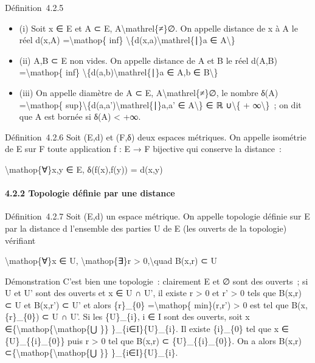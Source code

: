 \documentclass[]{article}
\begin{document}
Définition~4.2.5

\begin{itemize}
\itemsep1pt\parskip0pt
\item
  (i) Soit x ∈ E et A ⊂ E, A\textbackslash{}mathrel\{≠\}∅. On appelle
  distance de x à A le réel d(x,A) =\textbackslash{}mathop\{ inf\}
  \textbackslash{}\{d(x,a)\textbackslash{}mathrel\{∣\}a ∈
  A\textbackslash{}\}
\item
  (ii) A,B ⊂ E non vides. On appelle distance de A et B le réel d(A,B)
  =\textbackslash{}mathop\{ inf\}
  \textbackslash{}\{d(a,b)\textbackslash{}mathrel\{∣\}a ∈ A,b ∈
  B\textbackslash{}\}
\item
  (iii) On appelle diamètre de A ⊂ E, A\textbackslash{}mathrel\{≠\}∅, le
  nombre δ(A) =\textbackslash{}mathop\{
  sup\}\textbackslash{}\{d(a,a')\textbackslash{}mathrel\{∣\}a,a' ∈
  A\textbackslash{}\} ∈ ℝ ∪\textbackslash{}\{ + ∞\textbackslash{}\}~; on
  dit que A est bornée si δ(A) \textless{} +∞.
\end{itemize}

Définition~4.2.6 Soit (E,d) et (F,δ) deux espaces métriques. On appelle
isométrie de E sur F toute application f : E → F bijective qui conserve
la distance~:

\textbackslash{}mathop\{∀\}x,y ∈ E, δ(f(x),f(y)) = d(x,y)

\paragraph{4.2.2 Topologie définie par une distance}

Définition~4.2.7 Soit (E,d) un espace métrique. On appelle topologie
définie sur E par la distance d l'ensemble des parties U de E (les
ouverts de la topologie) vérifiant

\textbackslash{}mathop\{∀\}x ∈ U, \textbackslash{}mathop\{∃\}r
\textgreater{} 0,\textbackslash{}quad B(x,r) ⊂ U

Démonstration C'est bien une topologie~: clairement E et ∅ sont des
ouverts~; si U et U' sont des ouverts et x ∈ U ∩ U', il existe r
\textgreater{} 0 et r' \textgreater{} 0 tels que B(x,r) ⊂ U et B(x,r') ⊂
U' et alors \{r\}\_\{0\} =\textbackslash{}mathop\{ min\}(r,r')
\textgreater{} 0 est tel que B(x,\{r\}\_\{0\}) ⊂ U ∩ U'. Si les
\{U\}\_\{i\}, i ∈ I sont des ouverts, soit x
∈\{\textbackslash{}mathop\{\textbackslash{}mathop\{⋃ \}\}
\}\_\{i∈I\}\{U\}\_\{i\}. Il existe \{i\}\_\{0\} tel que x ∈
\{U\}\_\{\{i\}\_\{0\}\} puis r \textgreater{} 0 tel que B(x,r) ⊂
\{U\}\_\{\{i\}\_\{0\}\}. On a alors B(x,r)
⊂\{\textbackslash{}mathop\{\textbackslash{}mathop\{⋃ \}\}
\}\_\{i∈I\}\{U\}\_\{i\}.
\end{document}
